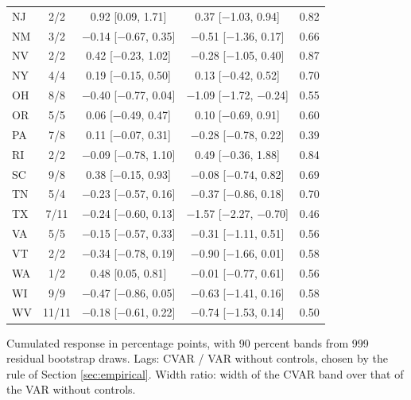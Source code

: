 \begin{table}[htbp]
\begin{tabular}{lcccc}
NJ & 2/2 & 0.92 [0.09, 1.71] & 0.37 [$-$1.03, 0.94] & 0.82 \\
NM & 3/2 & $-$0.14 [$-$0.67, 0.35] & $-$0.51 [$-$1.36, 0.17] & 0.66 \\
NV & 2/2 & 0.42 [$-$0.23, 1.02] & $-$0.28 [$-$1.05, 0.40] & 0.87 \\
NY & 4/4 & 0.19 [$-$0.15, 0.50] & 0.13 [$-$0.42, 0.52] & 0.70 \\
OH & 8/8 & $-$0.40 [$-$0.77, 0.04] & $-$1.09 [$-$1.72, $-$0.24] & 0.55 \\
OR & 5/5 & 0.06 [$-$0.49, 0.47] & 0.10 [$-$0.69, 0.91] & 0.60 \\
PA & 7/8 & 0.11 [$-$0.07, 0.31] & $-$0.28 [$-$0.78, 0.22] & 0.39 \\
RI & 2/2 & $-$0.09 [$-$0.78, 1.10] & 0.49 [$-$0.36, 1.88] & 0.84 \\
SC & 9/8 & 0.38 [$-$0.15, 0.93] & $-$0.08 [$-$0.74, 0.82] & 0.69 \\
TN & 5/4 & $-$0.23 [$-$0.57, 0.16] & $-$0.37 [$-$0.86, 0.18] & 0.70 \\
TX & 7/11 & $-$0.24 [$-$0.60, 0.13] & $-$1.57 [$-$2.27, $-$0.70] & 0.46 \\
VA & 5/5 & $-$0.15 [$-$0.57, 0.33] & $-$0.31 [$-$1.11, 0.51] & 0.56 \\
VT & 2/2 & $-$0.34 [$-$0.78, 0.19] & $-$0.90 [$-$1.66, 0.01] & 0.58 \\
WA & 1/2 & 0.48 [0.05, 0.81] & $-$0.01 [$-$0.77, 0.61] & 0.56 \\
WI & 9/9 & $-$0.47 [$-$0.86, 0.05] & $-$0.63 [$-$1.41, 0.16] & 0.58 \\
WV & 11/11 & $-$0.18 [$-$0.61, 0.22] & $-$0.74 [$-$1.53, 0.14] & 0.50 \\
\bottomrule
\end{tabular}
\par\smallskip\parbox{0.95\textwidth}{\footnotesize Cumulated response in percentage points, with 90 percent bands from 999 residual bootstrap draws. Lags: CVAR / VAR without controls, chosen by the rule of Section \ref{sec:empirical}. Width ratio: width of the CVAR band over that of the VAR without controls.}
\end{table}
